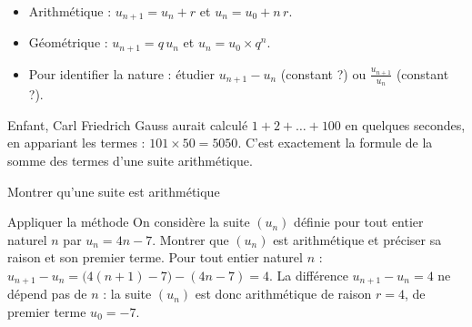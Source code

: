 \documentclass{gabarits/nexus-manuel-v5}
\begin{document}
\begin{aretenirV}
\begin{itemize}
  \item Arithmétique : $u_{n+1} = u_n + r$ \quad et \quad $u_n = u_0 + n\,r$.
  \item Géométrique : $u_{n+1} = q\,u_n$ \quad et \quad $u_n = u_0 \times q^n$.
  \item Pour identifier la nature : étudier $u_{n+1} - u_n$ (constant ?) ou
    $\frac{u_{n+1}}{u_n}$ (constant ?).
\end{itemize}
\end{aretenirV}

\begin{histoiredessciencesV}[Gauss, 1777--1855]
Enfant, Carl Friedrich Gauss aurait calculé $1 + 2 + \dots + 100$ en
quelques secondes, en appariant les termes : $101 \times 50 = 5050$. C'est
exactement la formule de la somme des termes d'une suite arithmétique.
\end{histoiredessciencesV}


\begin{methodeV}{Montrer qu'une suite est arithmétique}
\end{methodeV}

\begin{exerciceResoluSix}{Appliquer la méthode}
On considère la suite $(u_n)$ définie pour tout entier naturel $n$ par
$u_n = 4n - 7$. Montrer que $(u_n)$ est arithmétique et préciser sa raison
et son premier terme.
\tcblower
{}
Pour tout entier naturel $n$ :
$u_{n+1} - u_n = \bigl(4(n+1) - 7\bigr) - (4n - 7) = 4$.
La différence $u_{n+1} - u_n = 4$ ne dépend pas de $n$ : la suite $(u_n)$
est donc arithmétique de raison $r = 4$, de premier terme $u_0 = -7$.
\end{exerciceResoluSix}

\end{document}
